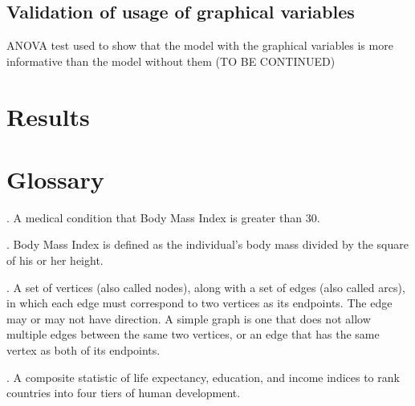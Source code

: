 \documentclass[oneside,12pt]{report}
\begin{document}
\section*{Validation of usage of graphical variables}
ANOVA test used to show that the model with the graphical variables is more informative than the model without them (TO BE CONTINUED)

\chapter{Results}





\appendix
{}


\chapter{Glossary}\label{Glossary}

\vspace{12pt}

\vspace{8pt}
. A medical condition that Body Mass Index is greater than 30.

\vspace{8pt}
. Body Mass Index is defined as the individual's body mass divided by the square of his or her height.

\vspace{8pt}
. A set of vertices (also called nodes), along with a set of edges (also called arcs), in which each edge must correspond to two vertices as its endpoints. The edge may or may not have direction. A simple graph is one that does not allow multiple edges between the same two vertices, or an edge that has the same vertex as both of its endpoints.

\vspace{8pt}
. A composite statistic of life expectancy, education, and income indices to rank countries into four tiers of human development.
\end{document}
